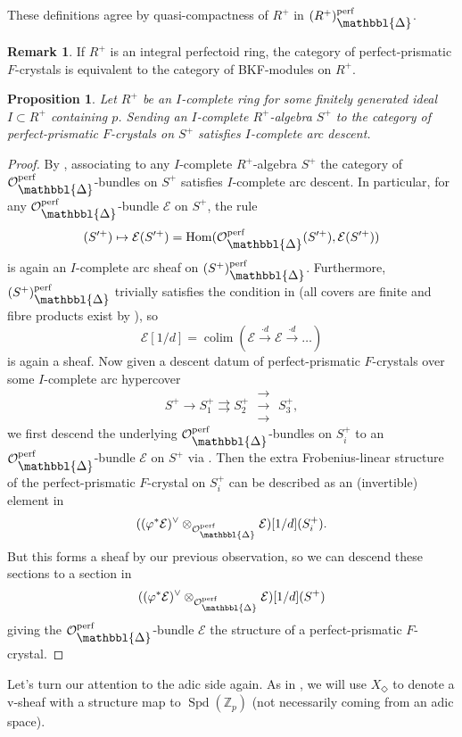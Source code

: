 \documentclass[10pt,twoside]{article}
\numberwithin{equation}{section}
\theoremstyle{plain}
\newtheorem{myprop}[mythm]{Proposition}
\theoremstyle{definition}
\newtheorem{myrem}[mythm]{Remark}
\DeclareMathOperator{\Spd}{Spd}
\DeclareMathOperator{\Hom}{Hom}
\DeclareMathOperator*{\colim}{colim}
\newcommand{\ZZ}{\mathbb{Z}}
\newcommand{\MCE}{\mathcal{E}}
\newcommand{\MCO}{\mathcal{O}}
\let \phi \varphi
\let \diamond \Diamond
\DeclareMathOperator{\perf}{perf}
\newcommand{\Prism}{{\mathlarger{\mathbbl{\Delta}}}}
\newcommand{\OpP}{\MCO^{\perf}_{\Prism}}
\newcommand{\rrrarrows}{\;\substack{\rightarrow\\[-1em] \rightarrow \\[-1em] \rightarrow}\;}
\begin{document}
These definitions agree by quasi-compactness of \(R^+\) in \((R^+)_{\Prism}^{\perf}\).

\begin{myrem}
    If \(R^+\) is an integral perfectoid ring, the category of perfect-prismatic \(F\)-crystals is equivalent to the category of BKF-modules on \(R^+\).
\end{myrem}


\begin{myprop}\label{arcDescentForFCrys}
Let \(R^+\) be an \(I\)-complete ring for some finitely generated ideal \(I\subset R^+\) containing \(p\). Sending an \(I\)-complete \(R^+\)-algebra \(S^+\) to the category of perfect-prismatic \(F\)-crystals on \(S^+\) satisfies \(I\)-complete arc descent.
\end{myprop}

\begin{proof}
By , associating to any \(I\)-complete \(R^+\)-algebra \(S^+\) the category of \(\OpP\)-bundles on \(S^+\) satisfies \(I\)-complete arc descent. In particular, for any \(\OpP\)-bundle \(\MCE\) on \(S^+\), the rule
\[(S'^+)\mapsto \MCE(S'^+)=\Hom(\MCO_{\Prism}^{\perf}(S'^+),\MCE(S'^+))\]
is again an \(I\)-complete arc sheaf on \((S^+)^{\perf}_{\Prism}\). Furthermore, \((S^+)_{\Prism}^{\perf}\) trivially satisfies the condition in \cite[0739]{Stacks} (all covers are finite and fibre products exist by ), so
\[\MCE[1/d]=\colim (\MCE\xrightarrow{\cdot d}\MCE\xrightarrow{\cdot d} \dots)\]
is again a sheaf. Now given a descent datum of perfect-prismatic \(F\)-crystals over some \(I\)-complete arc hypercover 
\[S^+\longrightarrow S_1^+\rightrightarrows S_2^+\rrrarrows S_3^+,\]
we first descend the underlying \(\OpP\)-bundles on \(S^+_i\) to an \(\OpP\)-bundle \(\MCE\) on \(S^+\) via . Then the extra Frobenius-linear structure of the perfect-prismatic \(F\)-crystal on \(S^+_i\) can be described as an (invertible) element in 
\[((\phi^*\MCE)^{\vee}\otimes_{\MCO_{\Prism}^{\perf}} \MCE)[1/d](S_i^+).\]
But this forms a sheaf by our previous observation, so we can descend these sections to a section in 
\[((\phi^*\MCE)^{\vee}\otimes_{\MCO_{\Prism}^{\perf}} \MCE)[1/d](S^+)\]
giving the \(\OpP\)-bundle \(\MCE\) the structure of a perfect-prismatic \(F\)-crystal.
\end{proof}

Let's turn our attention to the adic side again. As in , we will use \(X_\diamond\) to denote a v-sheaf with a structure map to \(\Spd(\ZZ_p)\) (not necessarily coming from an adic space).
\end{document}
